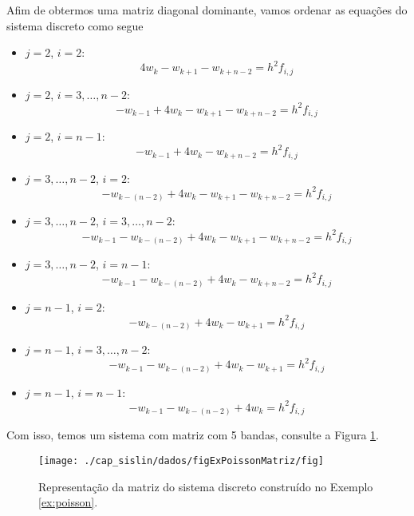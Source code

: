 \begin{ex}
  Afim de obtermos uma matriz diagonal dominante, vamos ordenar as equações do sistema discreto como segue
  \begin{itemize}
  \item $j=2$, $i=2$:
    \begin{equation}\label{cap_sislin_sec_matesparsa:eq:ex_poisson_deq0}
      4w_k - w_{k+1} - w_{k+n-2} = h^2f_{i,j}
    \end{equation}
  \item $j=2$, $i=3,\dotsc,n-2$:
    \begin{equation}
      -w_{k-1} + 4w_{k} - w_{k+1} - w_{k+n-2} = h^2f_{i,j}
    \end{equation}
  \item $j=2$, $i=n-1$:
    \begin{equation}
      -w_{k-1} + 4w_k - w_{k+n-2} = h^2f_{i,j}
    \end{equation}
  \item $j=3,\dotsc,n-2$, $i=2$:
    \begin{equation}
      -w_{k-(n-2)} + 4w_k - w_{k+1} - w_{k+n-2} = h^2f_{i,j}
    \end{equation}
  \item $j=3,\dotsc,n-2$, $i=3,\dotsc,n-2$:
    \begin{equation}
      -w_{k-1} - w_{k-(n-2)} + 4w_k - w_{k+1} - w_{k+n-2} = h^2f_{i,j}
    \end{equation}
  \item $j=3,\dotsc,n-2$, $i=n-1$:
    \begin{equation}
      -w_{k-1} - w_{k-(n-2)} + 4w_k - w_{k+n-2} = h^2f_{i,j} 
    \end{equation}
  \item $j=n-1$, $i=2$:
    \begin{equation}
      -w_{k-(n-2)} + 4w_k - w_{k+1} = h^2f_{i,j}
    \end{equation}
  \item $j=n-1$, $i=3,\dotsc,n-2$:
    \begin{equation}
      -w_{k-1} - w_{k-(n-2)} + 4w_k - w_{k+1} = h^2f_{i,j}
    \end{equation}
  \item $j=n-1$, $i=n-1$:
    \begin{equation}
      -w_{k-1} - w_{k-(n-2)} + 4w_k = h^2f_{i,j}\label{cap_sislin_sec_matesparsa:eq:ex_poisson_deq1}
    \end{equation}
  \end{itemize}
  Com isso, temos um sistema com matriz com 5 bandas, consulte a Figura \ref{fig:exPoissonMatriz}.

  \begin{figure}[H]
    \centering
    \texttt{[image: ./cap\_sislin/dados/figExPoissonMatriz/fig]}
    \caption{Representação da matriz do sistema discreto construído no Exemplo \ref{ex:poisson}.}
    \label{fig:exPoissonMatriz}
  \end{figure}
\end{ex}



